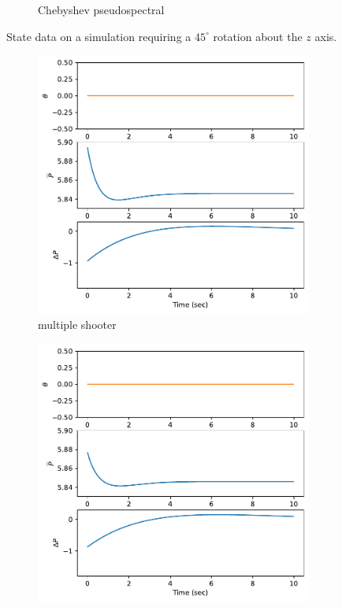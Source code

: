 \documentclass[]{article}
\begin{document}
\begin{figure}[H]
\begin{subfigure}[b]{0.3\textwidth}
		\caption{Chebyshev pseudospectral}
	\end{subfigure}
	\caption{State data on a simulation requiring a $45^{\circ}$ rotation about the $z$ axis.}
	\label{fig:state45z}
\end{figure}

\begin{figure}[H]
	\centering
	\begin{subfigure}[b]{0.3\textwidth}
		\centering
		\includegraphics[width=\textwidth]{figures/control45dz6.pdf}
		\caption{multiple shooter}
	\end{subfigure}
	\begin{subfigure}[b]{0.3\textwidth}
		\centering
		\includegraphics[width=\textwidth]{figures/control45dz4.pdf}

\end{subfigure}
\end{figure}
\end{document}
